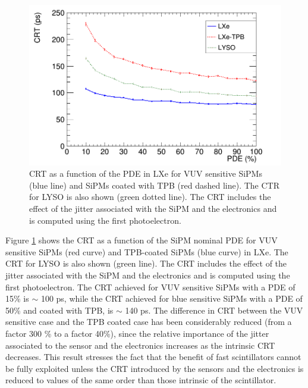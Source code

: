 \documentclass[review]{elsarticle}
\begin{document}
 \begin{figure}[!bhtp]
	\centering
	\includegraphics[scale=0.4]{../img/CTR_jitter_fixed_n.png}
	\caption{\label{fig.crt3} CRT as a function of the PDE in LXe for VUV sensitive SiPMs (blue line) and SiPMs coated with TPB (red dashed line). The CTR for LYSO is also shown (green dotted line). The CRT includes the
	effect of the jitter associated with the SiPM and the electronics and is computed using the first photoelectron.}
\end{figure}

Figure \ref{fig.crt3} shows the CRT as a function of the
 SiPM nominal PDE for VUV sensitive SiPMs (red curve) and TPB-coated SiPMs (blue curve) in LXe. The CRT for LYSO is also shown (green line). The CRT includes the
effect of the jitter associated with the SiPM and the electronics and is computed using the first photoelectron.
The CRT achieved for VUV sensitive SiPMs with a PDE of 15\% is $\sim$ 100 ps, while  the CRT achieved for blue sensitive SiPMs with a PDE of 50\% and coated with TPB, is $\sim$ 140 ps. The difference in CRT between the VUV sensitive case and the TPB coated case has been considerably reduced (from a factor 300 \% to a factor 40\%), since the relative importance of the jitter associated to the sensor and the electronics increases as the intrinsic CRT decreases. This result stresses the fact that the benefit of fast scintillators cannot be fully exploited unless the CRT introduced by the sensors and the electronics is reduced to values of the same order than those intrinsic of the scintillator. 
\end{document}
